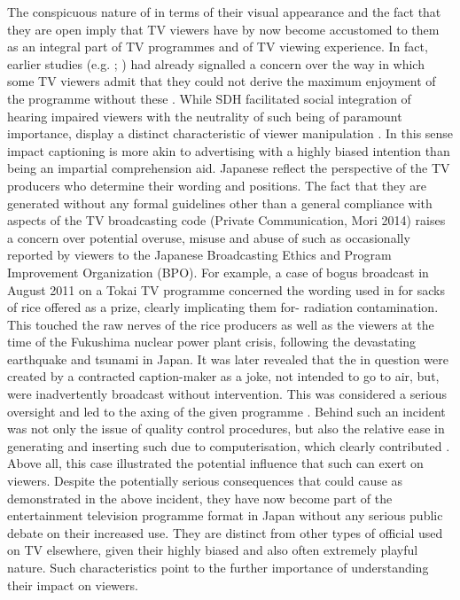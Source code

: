 \documentclass[output=paper]{langsci/langscibook}
\begin{document}
The conspicuous nature of  in terms of their visual appearance and the fact that they are open  imply that TV viewers have by now become accustomed to them as an integral part of TV programmes and of TV viewing experience. In fact, earlier studies (e.g. \citealt{Sakamoto1999}; \citealt{Kimura2000}) had already signalled a concern over the way in which some TV viewers admit that they could not derive the maximum enjoyment of the programme without these . While SDH facilitated social integration of hearing impaired viewers \citep[279]{diaz2013} with the neutrality of such  being of paramount importance,  display a distinct characteristic of viewer manipulation \citep{Shiota2003, ohagan2010, Sasamoto2014}. In this sense impact captioning is more akin to advertising with a highly biased intention than being an impartial comprehension aid. Japanese  reflect the perspective of the TV producers who   determine their wording and positions. The fact that they are generated without any formal guidelines other than a general compliance with aspects of the TV broadcasting code (Private Communication, Mori 2014) raises a concern over potential overuse, misuse and abuse of such  as occasionally reported by viewers to the Japanese Broadcasting Ethics and Program Improvement Organization (BPO). For example, a case of bogus  broadcast in August 2011 on a Tokai TV programme concerned the wording used in  for sacks of rice offered as a prize, clearly implicating them for- radiation contamination. This touched the raw nerves of the rice producers as well as the viewers at the time of the Fukushima nuclear power plant crisis, following the devastating earthquake and tsunami in Japan. It was later revealed that the  in question were created by a contracted caption-maker as a joke, not intended to go to air, but, were inadvertently broadcast without intervention. This was considered a serious oversight and led to the axing of the given programme \citep[36--37]{Kato2012}.  Behind such an incident was not only the issue of quality control procedures, but also the relative ease in generating and inserting such  due to computerisation, which clearly contributed \citep{Kato2012}. Above all, this case illustrated the potential influence that such  can exert on viewers.  Despite the potentially serious consequences that  could cause as demonstrated in the above incident, they have now become part of the entertainment television programme format in Japan without any serious public debate on their increased use. They are distinct from other types of official  used on TV elsewhere, given their highly biased and also often extremely playful nature. Such characteristics point to the further importance of understanding their impact on viewers. 
\end{document}
